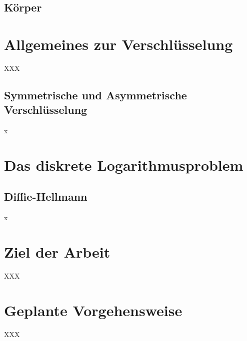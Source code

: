 \subsection{Körper}


\section{Allgemeines zur Verschlüsselung}
XXX

\subsection{Symmetrische und Asymmetrische Verschlüsselung}
x

\section{Das diskrete Logarithmusproblem}


\subsection{Diffie-Hellmann}
x


\section{Ziel der Arbeit}
XXX


\section{Geplante Vorgehensweise}
XXX